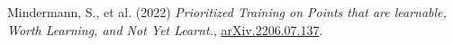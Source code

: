 \documentclass{article}
\begin{document}
    
    \begin{thebibliography}{9}
        Mindermann, S., et al. (2022) \emph{Prioritized Training on Points that are learnable, Worth Learning, and Not Yet Learnt.}, \href{https://doi.org/10.48550/arXiv.2206.07137}{arXiv.2206.07.137}.
        
        \bibitem{}
        \end{thebibliography}
\end{document}
